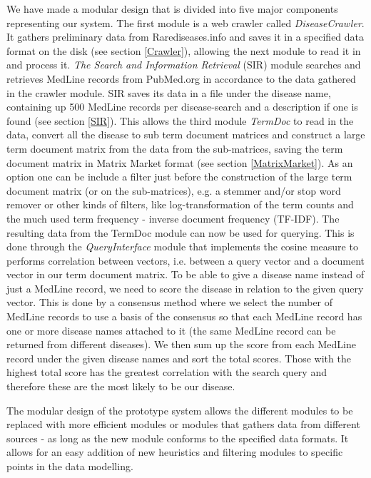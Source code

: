 We have made a modular design that is divided into five major
components representing our system. The first module is a web crawler
called \textit{DiseaseCrawler}. It gathers preliminary data from
Rarediseases.info and saves it in a specified data format on the disk
(see section \ref{Crawler}), allowing the next module to read it in
and process it. \textit{The Search and Information Retrieval} (SIR)
module searches and retrieves MedLine records from PubMed.org in
accordance to the data gathered in the crawler module. SIR saves its
data in a file under the disease name, containing up 500 MedLine
records per disease-search and a description if one is found (see
section \ref{SIR}). This allows the third module \textit{TermDoc} to
read in the data, convert all the disease to sub term document
matrices and construct a large term document matrix from the data from
the sub-matrices, saving the term document matrix in Matrix Market
format (see section \ref{MatrixMarket}). As an option one can be include a filter
just before the construction of the large term document matrix (or on
the sub-matrices), e.g. a stemmer and/or stop word remover or other
kinds of filters, like log-transformation of the term counts and the
much used term frequency - inverse document frequency (TF-IDF). The
resulting data from the TermDoc module can now be used for
querying. This is done through the \textit{QueryInterface} module that
implements the cosine measure to performs correlation between vectors,
i.e. between a query vector and a document vector in our term document
matrix. To be able to give a disease name instead of just a MedLine
record, we need to score the disease in relation to the given query
vector. This is done by a consensus method where we select the number
of MedLine records to use a basis of the consensus so that each
MedLine record has one or more disease names attached to it (the same
MedLine record can be returned from different diseases). We then sum
up the score from each MedLine record under the given disease names
and sort the total scores. Those with the highest total score has the
greatest correlation with the search query and therefore these are the
most likely to be our disease.

The modular design of the prototype system allows the different
modules to be replaced with more efficient modules or modules that
gathers data from different sources - as long as the new module
conforms to the specified data formats. It allows for an easy addition
of new heuristics and filtering modules to specific points in the data
modelling.

